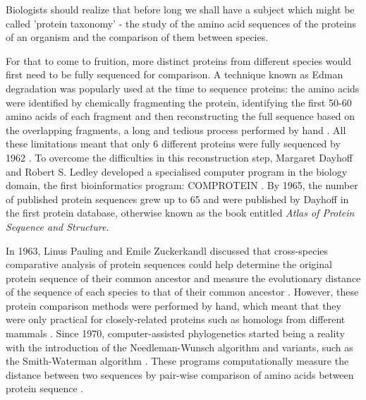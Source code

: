 \begin{displayquote}
Biologists should realize that before long we shall have a subject which might be called 'protein taxonomy' - the study of the amino acid sequences of the proteins of an organism and the comparison of them between species.
\end{displayquote}

For that to come to fruition, more distinct proteins from different species would first need to be fully sequenced for comparison. A technique known as Edman degradation was popularly used at the time to sequence proteins: the amino acids were identified by chemically fragmenting the protein, identifying the first 50-60 amino acids of each fragment and then reconstructing the full sequence based on the overlapping fragments, a long and tedious process performed by hand \cite{gauthier:2018ws,edman:1949ww}. All these limitations meant that only 6 different proteins were fully sequenced by 1962 \cite{dayhoff:1962up}. To overcome the difficulties in this reconstruction step, Margaret Dayhoff and Robert S. Ledley developed a specialised computer program in the biology domain, the first bioinformatics program: COMPROTEIN \cite{gauthier:2018ws,dayhoff:1962up}. By 1965, the number of published protein sequences grew up to 65 and were published by Dayhoff in the first protein database, otherwise known as the book entitled \emph{Atlas of Protein Sequence and Structure}\cite{dayhoff:1965vv}.

In 1963, Linus Pauling and Emile Zuckerkandl discussed that cross-species comparative analysis of protein sequences could help determine the original protein sequence of their common ancestor and measure the evolutionary distance of the sequence of each species to that of their common ancestor \cite{pauling:1963uo}. However, these protein comparison methods were performed by hand, which meant that they were only practical for closely-related proteins such as homologs from different mammals \cite{gauthier:2018ws}. Since 1970, computer-assisted phylogenetics started being a reality with the introduction of the Needleman-Wunsch algorithm \cite{needleman:1970vq} and variants, such as the Smith-Waterman algorithm \cite{smith:1981up}. These programs computationally measure the distance between two sequences by pair-wise comparison of amino acids between protein sequence \cite{needleman:1970vq,smith:1981up}.


